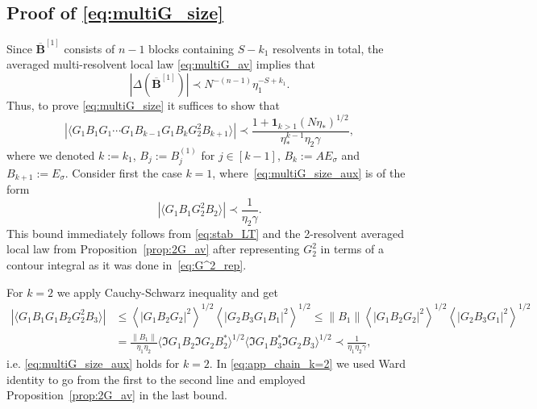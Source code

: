 \documentclass[10pt]{amsart}
\numberwithin{equation}{section}
\begin{document}
\subsection{Proof of \eqref{eq:multiG_size}}\label{app:multiG_size} Since $\overline{\bm{B}}^{[1]}$ consists of $n-1$ blocks containing $S-k_1$ resolvents in total, the averaged multi-resolvent local law \eqref{eq:multiG_av} implies that 
\begin{equation*}
\left\vert\Delta\left(\overline{\bm{B}}^{[1]}\right)\right\vert \prec N^{-(n-1)} \eta_1^{-S+k_1}.
\end{equation*}
Thus, to prove \eqref{eq:multiG_size} it suffices to show that
\begin{equation}
\left\vert\langle G_1 B_1G_1\cdots G_1 B_{k-1}G_1B_kG_2^2 B_{k+1}\rangle\right\vert \prec \frac{1+\bm{1}_{k>1}(N\eta_*)^{1/2}}{\eta_*^{k-1}\eta_2\gamma},
\label{eq:multiG_size_aux}
\end{equation}
where we denoted $k:=k_1$, $B_j:=B_j^{(1)}$ for $j\in[k-1]$, $B_{k}:=AE_\sigma$ and $B_{k+1}:=E_\sigma$. Consider first the case $k=1$, where~\eqref{eq:multiG_size_aux} is of the form
\begin{equation}
\left\vert \langle G_1B_1G_2^2 B_2\rangle\right\vert \prec \frac{1}{\eta_2\gamma}.
\end{equation}
This bound immediately follows from \eqref{eq:stab_LT} and the 2-resolvent averaged local law from Proposition~\ref{prop:2G_av} after representing $G_2^2$ in terms of a contour integral as it was done in~\eqref{eq:G^2_rep}.

For $k=2$ we apply Cauchy-Schwarz inequality and get
\begin{equation}
\begin{split}
\left\vert \langle G_1B_1G_1B_2G_2^2B_3\rangle\right\vert &\le \left\langle  |G_1B_2G_2|^2\right\rangle^{1/2}\left\langle |G_2B_3G_1B_1|^2\right\rangle^{1/2} \le \lVert B_1\rVert  \left\langle  |G_1B_2G_2|^2\right\rangle^{1/2}\left\langle |G_2B_3G_1|^2\right\rangle^{1/2}\\
&= \frac{\lVert B_1\rVert}{\eta_1\eta_2}\langle \Im G_1B_2\Im G_2 B_2^*\rangle^{1/2}\langle \Im G_1B_3^*\Im G_2 B_3\rangle^{1/2}\prec \frac{1}{\eta_1\eta_2\gamma},
\end{split}
\label{eq:app_chain_k=2}
\end{equation}
i.e. \eqref{eq:multiG_size_aux} holds for $k=2$. In \eqref{eq:app_chain_k=2} we used Ward identity to go from the first to the second line and employed Proposition~\ref{prop:2G_av} in the last bound.
\end{document}
